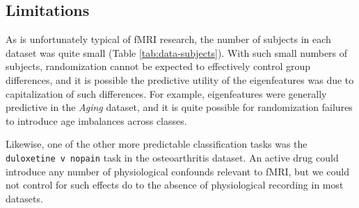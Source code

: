 \documentclass[12pt]{spieman}  %
\newcommand{\code}[1]{\small\texttt{#1}\normalsize}
\begin{document}
\begin{spacing}{2}


\subsection{Limitations}
As is unfortunately typical of fMRI research\cite{turnerSmallSampleSizes2018},
the number of subjects in each dataset was quite small (Table
\ref{tab:data-subjects}). With such small numbers of subjects, randomization
cannot be expected to effectively control group differences, and it is possible
the predictive utility of the eigenfeatures was due to capitalization of such
differences. For example, eigenfeatures were generally predictive in the
\textit{Aging} dataset, and it is quite possible for randomization failures to
introduce age imbalances across classes.

Likewise, one of the other more predictable classification tasks was the
\code{duloxetine v nopain} task in the osteoarthritis dataset. An active drug
could introduce any number of physiological confounds relevant to
fMRI\cite{murphyRestingstateFMRIConfounds2013}, but we could not control for
such effects do to the absence of physiological recording in most datasets.


\end{spacing}
\end{document}
